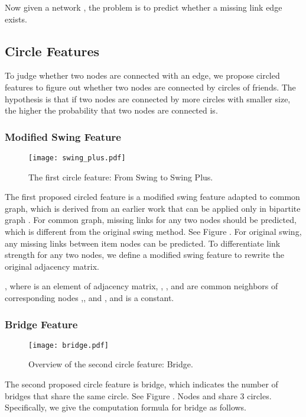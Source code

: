\documentclass[sigconf]{acmart}
\begin{document}
Now given a  network , the problem is to predict whether a missing link edge  exists. 

\subsection{Circle Features}
To judge whether two nodes are connected with an edge,  we propose circled features to figure out whether two nodes are connected by circles of friends. The hypothesis is that if two nodes are connected by more circles with smaller size, the higher the probability that two nodes are connected is.

\subsubsection{Modified Swing Feature}

\begin{figure*}[htbp]
\centering
\texttt{[image: swing\_plus.pdf]}
\caption{The first circle feature: From Swing to Swing Plus.} \label{fig_swing}
\end{figure*}

The first proposed circled feature is a modified swing feature adapted to common graph, which is derived from an earlier work that can be applied only in bipartite graph \citep{yang2020large}. For common graph, missing links for any two nodes should be predicted, which is different from the original swing method. See Figure . For original swing, any missing links between item nodes can be predicted. To differentiate link strength for any two nodes, we define a modified swing feature to rewrite the original adjacency matrix.


, where  is an element of adjacency matrix, ,  ,  and  are common neighbors of corresponding nodes ,, and , and  is a constant.

\subsubsection{Bridge Feature}


\begin{figure*}[htbp]
\centering
\texttt{[image: bridge.pdf]}
\caption{Overview of the second circle feature: Bridge.} \label{fig_bridge}
\end{figure*}

The second proposed circle feature is bridge, which indicates the number of bridges that share the same circle. See Figure . Nodes  and  share 3 circles. Specifically, we give the computation formula for bridge as follows.
\end{document}

